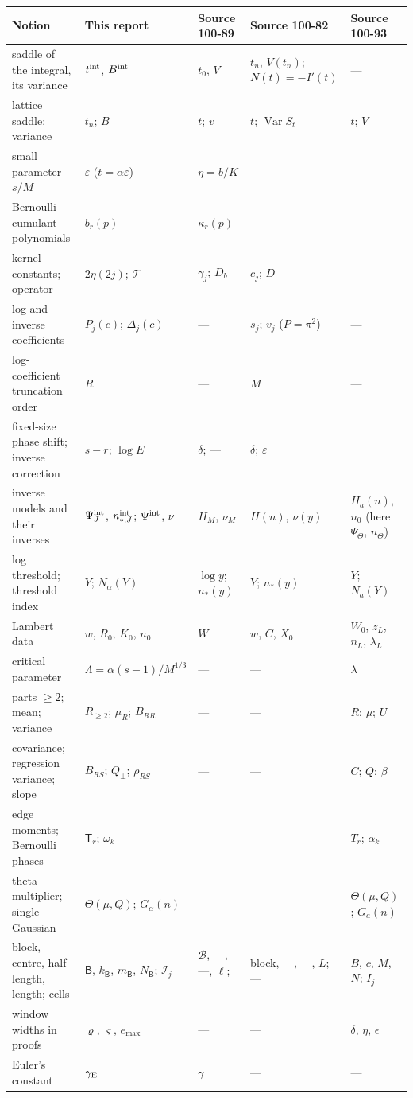 \documentclass[11pt]{article}
\numberwithin{equation}{section}
\theoremstyle{definition}\newtheorem{definition}[theorem]{Definition}
\theoremstyle{remark}\newtheorem{remark}[theorem]{Remark}
\newcommand{\eps}{\varepsilon}
\DeclareMathOperator{\Var}{Var}
\newcommand{\Top}{\mathcal T}
\begin{document}
\begin{center}
\smallskip
\begin{tabular}{>{\raggedright\arraybackslash}p{3.3cm}>{\raggedright\arraybackslash}p{3.0cm}>{\raggedright\arraybackslash}p{2.6cm}>{\raggedright\arraybackslash}p{2.6cm}>{\raggedright\arraybackslash}p{2.6cm}}
\toprule
Notion & This report & Source 100-89 & Source 100-82 & Source 100-93\\
\midrule
saddle of the integral, its variance & $t^{\rm int}$, $B^{\rm int}$ & $t_0$, $V$ & $t_n$, $V(t_n)$; $N(t)=-I'(t)$ & ---\\
lattice saddle; variance & $t_n$; $B$ & $t$; $v$ & $t$; $\Var S_t$ & $t$; $V$\\
small parameter $s/M$ & $\eps$ ($t=\alpha\eps$) & $\eta=b/K$ & --- & ---\\
Bernoulli cumulant polynomials & $b_r(p)$ & $\kappa_r(p)$ & --- & ---\\
kernel constants; operator & $2\eta(2j)$; $\Top$ & $\gamma_j$; $D_b$ & $c_j$; $D$ & ---\\
log and inverse coefficients & $P_j(c)$; $\Delta_j(c)$ & --- & $s_j$; $v_j$ ($P=\pi^2$) & ---\\
log-coefficient truncation order & $R$ & --- & $M$ & ---\\
fixed-size phase shift; inverse correction & $s-r$; $\log E$ & $\delta$; --- & $\delta$; $\varepsilon$\\
inverse models and their inverses & $\Psi^{\rm int}_J$, $n^{\rm int}_{*,J}$; $\Psi^{\rm int}$, $\nu$ & $H_M$, $\nu_M$ & $H(n)$, $\nu(y)$ & $H_a(n)$, $n_0$ (here $\Psi_\Theta$, $n_\Theta$)\\
log threshold; threshold index & $Y$; $N_\alpha(Y)$ & $\log y$; $n_*(y)$ & $Y$; $n_*(y)$ & $Y$; $N_a(Y)$\\
Lambert data & $w$, $R_0$, $K_0$, $n_0$ & $W$ & $w$, $C$, $X_0$ & $W_0$, $z_L$, $n_L$, $\lambda_L$\\
critical parameter & $\Lambda=\alpha(s-1)/M^{1/3}$ & --- & --- & $\lambda$\\
parts $\ge2$; mean; variance & $R_{\ge2}$; $\mu_R$; $B_{RR}$ & --- & --- & $R$; $\mu$; $U$\\
covariance; regression variance; slope & $B_{RS}$; $Q_\perp$; $\rho_{RS}$ & --- & --- & $C$; $Q$; $\beta$\\
edge moments; Bernoulli phases & $\mathsf T_r$; $\omega_k$ & --- & --- & $T_r$; $\alpha_k$\\
theta multiplier; single Gaussian & $\Theta(\mu,Q)$; $G_\alpha(n)$ & --- & --- & $\Theta(\mu,Q)$; $G_a(n)$\\
block, centre, half-length, length; cells & $\mathsf B$, $k_{\mathsf B}$, $m_{\mathsf B}$, $N_{\mathsf B}$; $\mathcal I_j$ & $\mathcal B$, ---, ---, $\ell$; --- & block, ---, ---, $L$; --- & $B$, $c$, $M$, $N$; $I_j$\\
window widths in proofs & $\varrho$, $\varsigma$, $e_{\max}$ & --- & --- & $\delta$, $\eta$, $\epsilon$\\
Euler's constant & $\gamma_{\rm E}$ & $\gamma$ & --- & ---\\
\bottomrule
\end{tabular}
\end{center}
\end{document}
